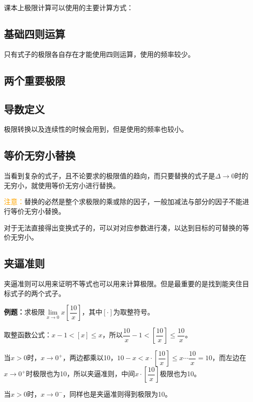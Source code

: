 课本上极限计算可以使用的主要计算方式：

\subsection{基础四则运算}

只有式子的极限各自存在才能使用四则运算，使用的频率较少。

\subsection{两个重要极限}

\subsection{导数定义}

极限转换以及连续性的时候会用到，但是使用的频率也较小。

\subsection{等价无穷小替换}

当看到复杂的式子，且不论要求的极限值的趋向，而只要替换的式子是$\Delta\to 0$时的无穷小，就使用等价无穷小进行替换。

\textcolor{orange}{注意：}替换的必然是整个求极限的乘或除的因子，一般加减法与部分的因子不能进行等价无穷小替换。

对于无法直接得出变换式子的，可以对对应参数进行凑，以达到目标的可替换的等价无穷小。

\subsection{夹逼准则}

夹逼准则可以用来证明不等式也可以用来计算极限。但是最重要的是找到能夹住目标式子的两个式子。\medskip

\textbf{例题：}求极限$\lim\limits_{x\to 0}x\left[\dfrac{10}{x}\right]$，其中$[\cdot]$为取整符号。

取整函数公式：$x-1<[x]\leqslant x$，所以$\dfrac{10}{x}-1<\left[\dfrac{10}{x}\right]\leqslant\dfrac{10}{x}$。

当$x>0$时，$x\to 0^+$，两边都乘以10，$10-x<x\cdot\left[\dfrac{10}{x}\right]\leqslant x\cdots\dfrac{10}{x}=10$，而左边在$x\to 0^+$时极限也为10，所以夹逼准则，中间$x\cdot\left[\dfrac{10}{x}\right]$极限也为10。\medskip

当$x>0$时，$x\to 0^-$，同样也是夹逼准则得到极限为10。\medskip

